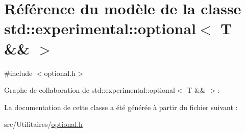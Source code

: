 \hypertarget{classstd_1_1experimental_1_1optional_3_01_t_01_6_6_01_4}{}\section{Référence du modèle de la classe std\+:\+:experimental\+:\+:optional$<$ T \&\& $>$}
\label{classstd_1_1experimental_1_1optional_3_01_t_01_6_6_01_4}


{\ttfamily \#include $<$optional.\+h$>$}



Graphe de collaboration de std\+:\+:experimental\+:\+:optional$<$ T \&\& $>$\+:


La documentation de cette classe a été générée à partir du fichier suivant \+:\begin{DoxyCompactItemize}
\item 
src/\+Utilitaires/\hyperlink{optional_8h}{optional.\+h}\end{DoxyCompactItemize}
